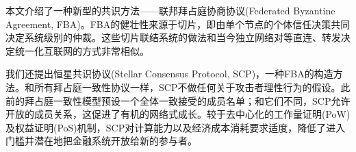 \abstract{}
本文介绍了一种新型的共识方法——联邦拜占庭协商协议(Federated Byzantine Agreement, FBA)。FBA的健壮性来源于{\quorum}切片，即由单个节点的个体信任决策共同决定系统级别的仲裁。这些切片联结系统的做法和当今独立网络对等直连、转发决定统一化互联网的方式非常相似。

我们还提出恒星共识协议(Stellar Consensus Protocol, SCP)，一种FBA的构造方法。和所有拜占庭一致性协议一样，SCP不做任何关于攻击者理性行为的假设。此前的拜占庭一致性模型预设一个全体一致接受的成员名单；和它们不同，SCP允许开放的成员关系，这促进了有机的网络式成长。较于去中心化的工作量证明(PoW)及权益证明(PoS)机制，SCP对计算能力以及经济成本消耗要求适度，降低了进入门槛并潜在地把金融系统开放给新的参与者。